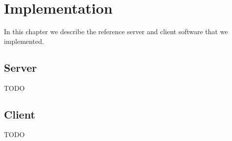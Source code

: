 
\chapter{Implementation}

In this chapter we describe the reference server and client software that we implemented.

\section{Server}

TODO

\section{Client}

TODO
